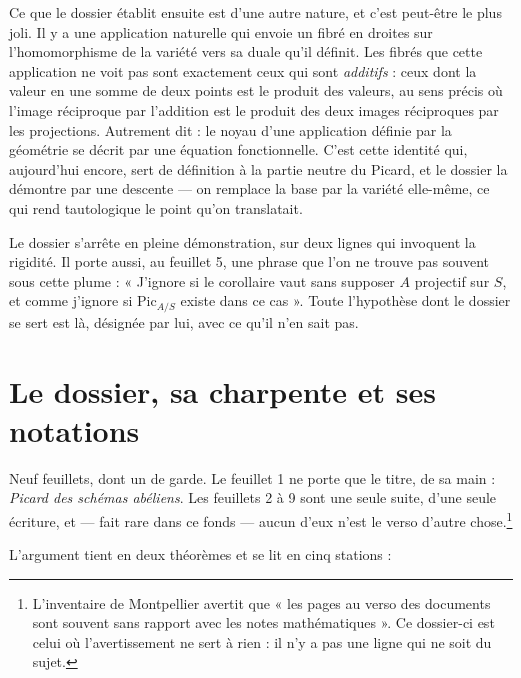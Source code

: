 \documentclass[11pt,a4paper]{article}
\begin{document}
\begin{resume}
Ce que le dossier établit ensuite est d'une autre nature, et c'est peut-être
le plus joli. Il y a une application naturelle qui envoie un fibré en droites
sur l'homomorphisme de la variété vers sa duale qu'il définit. Les fibrés que
cette application ne voit pas sont exactement ceux qui sont \emph{additifs} :
ceux dont la valeur en une somme de deux points est le produit des valeurs, au
sens précis où l'image réciproque par l'addition est le produit des deux
images réciproques par les projections. Autrement dit : le noyau d'une
application définie par la géométrie se décrit par une équation
fonctionnelle. C'est cette identité qui, aujourd'hui encore, sert de
définition à la partie neutre du Picard, et le dossier la démontre par une
descente — on remplace la base par la variété elle-même, ce qui rend
tautologique le point qu'on translatait.

Le dossier s'arrête en pleine démonstration, sur deux lignes qui invoquent la
rigidité. Il porte aussi, au feuillet 5, une phrase que l'on ne trouve pas
souvent sous cette plume : « J'ignore si le corollaire vaut sans supposer $A$
projectif sur $S$, et comme j'ignore si $\mathrm{Pic}_{A/S}$ existe dans ce
cas ». Toute l'hypothèse dont le dossier se sert est là, désignée par lui,
avec ce qu'il n'en sait pas.

\end{resume}

\section*{Le dossier, sa charpente et ses notations}

Neuf feuillets, dont un de garde. Le feuillet 1 ne porte que le titre, de sa
main : \emph{Picard des schémas abéliens}. Les feuillets 2 à 9 sont une seule
suite, d'une seule écriture, et — fait rare dans ce fonds — aucun d'eux n'est
le verso d'autre chose.\footnote{L'inventaire de Montpellier avertit que « les
pages au verso des documents sont souvent sans rapport avec les notes
mathématiques ». Ce dossier-ci est celui où l'avertissement ne sert à rien : il
n'y a pas une ligne qui ne soit du sujet.}

L'argument tient en deux théorèmes et se lit en cinq stations :
\end{document}
